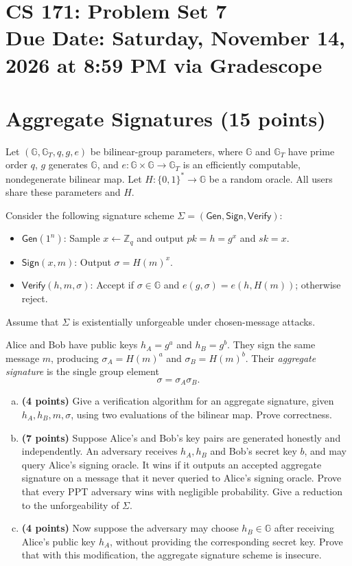 \documentclass[11pt]{article}
\newcommand{\Gen}{\mathsf{Gen}}
\newcommand{\Sign}{\mathsf{Sign}}
\newcommand{\Verify}{\mathsf{Verify}}
\newcommand{\GG}{\mathbb{G}}
\newcommand{\ZZ}{\mathbb{Z}}
\newcommand{\duedate}{Saturday, November 14, 2026 at 8:59 PM via Gradescope}
\begin{document}
\section*{CS 171: Problem Set 7\\ {\small Due Date: \duedate}}

\section{Aggregate Signatures (15 points)}
Let $(\GG,\GG_T,q,g,e)$ be bilinear-group parameters, where $\GG$ and
$\GG_T$ have prime order $q$, $g$ generates $\GG$, and
$e:\GG\times\GG\to\GG_T$ is an efficiently computable, nondegenerate
bilinear map. Let $H:\{0,1\}^*\to\GG$ be a random oracle.
All users share these parameters and $H$.

Consider the following signature scheme $\Sigma=(\Gen,\Sign,\Verify)$:
\begin{itemize}
    \item $\Gen(1^n)$: Sample $x\leftarrow\ZZ_q$ and output
    $pk=h=g^x$ and $sk=x$.
    \item $\Sign(x,m)$: Output $\sigma=H(m)^x$.
    \item $\Verify(h,m,\sigma)$: Accept if $\sigma\in\GG$ and
    $e(g,\sigma)=e(h,H(m))$; otherwise reject.
\end{itemize}
Assume that $\Sigma$ is existentially unforgeable under chosen-message
attacks.

Alice and Bob have public keys $h_A=g^a$ and $h_B=g^b$. They sign the
same message $m$, producing $\sigma_A=H(m)^a$ and $\sigma_B=H(m)^b$.
Their \emph{aggregate signature} is the single group element
\[
    \sigma=\sigma_A\sigma_B.
\]

\begin{enumerate}[(a)]
    \item \textbf{(4 points)} Give a verification algorithm for an
    aggregate signature, given $h_A,h_B,m,\sigma$, using two evaluations
    of the bilinear map. Prove correctness.

    \item \textbf{(7 points)} Suppose Alice's and Bob's key pairs are
    generated honestly and independently. An adversary receives
    $h_A,h_B$ and Bob's secret key $b$, and may query Alice's signing
    oracle. It wins if it outputs an accepted aggregate signature on a
    message that it never queried to Alice's signing oracle.
    Prove that every PPT adversary wins with negligible probability.
    Give a reduction to the unforgeability of $\Sigma$.

    \item \textbf{(4 points)} Now suppose the adversary may choose
    $h_B\in\GG$ after receiving Alice's public key $h_A$, without
    providing the corresponding secret key. Prove that with this
    modification, the aggregate signature scheme is insecure.
\end{enumerate}
\end{document}
